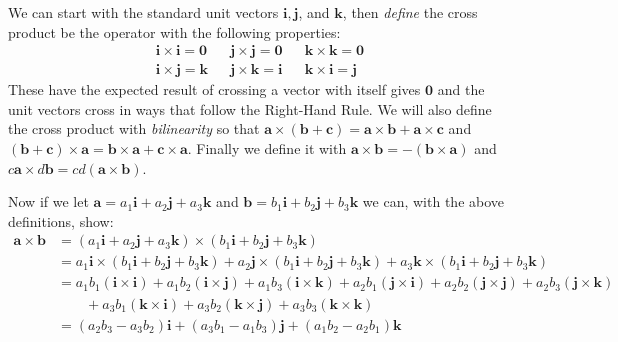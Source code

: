 \documentclass[letterpaper, 11pt, openany]{book}
\theoremstyle{mytheoremstyle}
\theoremstyle{myexamplestyle}
\begin{document}
We can start with the standard unit vectors \(\mathbf{i}, \mathbf{j}\), and \(\mathbf{k}\), then \textit{define} the cross product be the operator with the following properties:
\begin{align*}
    \mathbf{i} \times \mathbf{i} = \mathbf{0} && \mathbf{j} \times \mathbf{j} = \mathbf{0} && \mathbf{k} \times \mathbf{k} = \mathbf{0}\\
    \mathbf{i} \times \mathbf{j} = \mathbf{k} && \mathbf{j} \times \mathbf{k} = \mathbf{i} && \mathbf{k} \times \mathbf{i} = \mathbf{j}
\end{align*}
These have the expected result of crossing a vector with itself gives \(\mathbf{0}\) and the unit vectors cross in ways that follow the Right-Hand Rule. We will also define the cross product with \textit{bilinearity} so that \(\mathbf{a} \times (\mathbf{b} + \mathbf{c}) = \mathbf{a} \times \mathbf{b} + \mathbf{a} \times \mathbf{c}\) and \((\mathbf{b} + \mathbf{c})\times \mathbf{a} = \mathbf{b} \times \mathbf{a} + \mathbf{c} \times \mathbf{a}\). Finally we define it with \(\mathbf{a} \times \mathbf{b} = -(\mathbf{b} \times \mathbf{a})\) and \(c \mathbf{a} \times d\mathbf{b} = cd (\mathbf{a} \times \mathbf{b})\).

Now if we let \(\mathbf{a} = a_1 \mathbf{i} + a_2 \mathbf{j} + a_3 \mathbf{k}\) and \(\mathbf{b} = b_1 \mathbf{i} + b_2 \mathbf{j} + b_3 \mathbf{k}\) we can, with the above definitions, show:
\begin{align*}
    \mathbf{a} \times \mathbf{b} &= (a_1 \mathbf{i} + a_2 \mathbf{j} + a_3 \mathbf{k}) \times (b_1 \mathbf{i} + b_2 \mathbf{j} + b_3 \mathbf{k})\\
        &= a_1\mathbf{i} \times (b_1 \mathbf{i} + b_2 \mathbf{j} + b_3 \mathbf{k}) + a_2\mathbf{j} \times (b_1 \mathbf{i} + b_2 \mathbf{j} + b_3 \mathbf{k}) + a_3\mathbf{k} \times (b_1 \mathbf{i} + b_2 \mathbf{j} + b_3 \mathbf{k})\\
        &= a_1 b_1(\mathbf{i} \times \mathbf{i}) + a_1 b_2 (\mathbf{i} \times \mathbf{j}) + a_1 b_3 (\mathbf{i} \times \mathbf{k}) + a_2 b_1 (\mathbf{j} \times \mathbf{i}) + a_2 b_2 (\mathbf{j} \times \mathbf{j}) + a_2 b_3 (\mathbf{j} \times \mathbf{k})\\
        &\qquad + a_3 b_1 (\mathbf{k} \times \mathbf{i}) + a_3 b_2 (\mathbf{k} \times \mathbf{j}) + a_3 b_3 (\mathbf{k} \times \mathbf{k})\\
        &= (a_2 b_3-a_3 b_2) \mathbf{i} + (a_3 b_1-a_1 b_3) \mathbf{j} + (a_1 b_2-a_2 b_1)\mathbf{k}
\end{align*}
\end{document}
